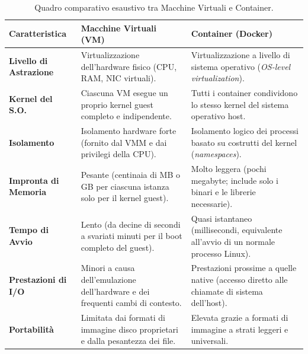 \documentclass[11pt, a4paper]{article}
\begin{document}
\begin{table}[H]
    \centering
    \small
    \begin{tabularx}{\textwidth}{p{3.5cm} X X}
        \toprule
        \textbf{Caratteristica} & \textbf{Macchine Virtuali (VM)} & \textbf{Container (Docker)} \\
        \midrule
        \textbf{Livello di Astrazione} & Virtualizzazione dell'hardware fisico (CPU, RAM, NIC virtuali). & Virtualizzazione a livello di sistema operativo (\emph{OS-level virtualization}). \\
        \midrule
        \textbf{Kernel del S.O.} & Ciascuna VM esegue un proprio kernel guest completo e indipendente. & Tutti i container condividono lo stesso kernel del sistema operativo host. \\
        \midrule
        \textbf{Isolamento} & Isolamento hardware forte (fornito dal VMM e dai privilegi della CPU). & Isolamento logico dei processi basato su costrutti del kernel (\emph{namespaces}). \\
        \midrule
        \textbf{Impronta di Memoria} & Pesante (centinaia di MB o GB per ciascuna istanza solo per il kernel guest). & Molto leggera (pochi megabyte; include solo i binari e le librerie necessarie). \\
        \midrule
        \textbf{Tempo di Avvio} & Lento (da decine di secondi a svariati minuti per il boot completo del guest). & Quasi istantaneo (millisecondi, equivalente all'avvio di un normale processo Linux). \\
        \midrule
        \textbf{Prestazioni di I/O} & Minori a causa dell'emulazione dell'hardware e dei frequenti cambi di contesto. & Prestazioni prossime a quelle native (accesso diretto alle chiamate di sistema dell'host). \\
        \midrule
        \textbf{Portabilità} & Limitata dai formati di immagine disco proprietari e dalla pesantezza dei file. & Elevata grazie a formati di immagine a strati leggeri e universali. \\
        \bottomrule
    \end{tabularx}
    \caption{Quadro comparativo esaustivo tra Macchine Virtuali e Container.}
    \label{tab:vm_vs_docker}
\end{table}

\newpage

\end{document}

